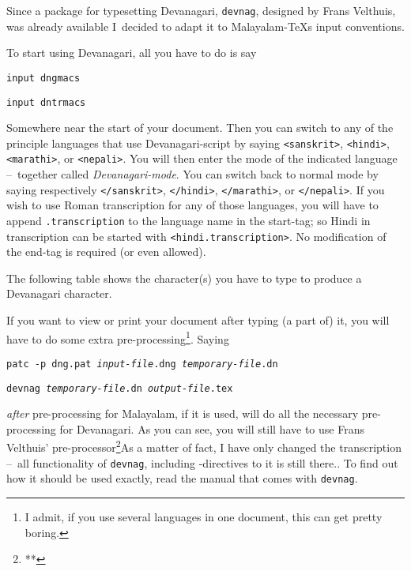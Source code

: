 





Since a package for typesetting Devanagari,
{\tt devnag}, designed by Frans Velthuis, was already available
I~decided to adapt it to Malayalam-\TeX s input conventions.

To start using Devanagari, all you have to do is say

\medskip
{\tt \bslash input dngmacs}

{\tt \bslash input dntrmacs}
\medskip

Somewhere near the start of your document. Then you can switch to
any of the principle languages that use Devanagari-script by saying
{\tt<{}sanskrit>}, {\tt<{}hindi>}, {\tt<{}marathi>}, or {\tt<{}nepali>}.
You will then enter the mode of the indicated language --~together
called {\it Devanagari-mode}.
You can switch back to normal mode by saying respectively
{\tt<{}/sanskrit>}, {\tt<{}/hindi>}, {\tt<{}/marathi>}, or {\tt<{}/nepali>}.
If you wish to use Roman transcription for any of those
languages, you will have to append {\tt .transcription} to the language
name in the start-tag; so Hindi in transcription can be started
with {\tt<{}hindi.transcription>}. No modification of the end-tag is
required (or even allowed).

The following table shows the character(s) you have to type to produce
a Devanagari character.

\bigskip

\bigskip

If you want to view or print your document after typing (a part of) it,
you will have to do some extra pre-processing\footnote*{I admit, if you
use several languages in one document, this can get pretty boring.}.
Saying

\medskip
{\tt patc -p dng.pat {\it input-file}.dng {\it temporary-file}.dn }

{\tt devnag {\it temporary-file}.dn {\it output-file}.tex}
\medskip

{\it after} pre-processing for Malayalam, if it is used,
will do all the necessary pre-processing for Devanagari. As you
can see, you will still have to use Frans Velthuis'
pre-processor\footnote{**}{As a matter of fact, I have only changed
the transcription --~all functionality of {\tt devnag}, including
{\tt@}-directives to it is still there.}.
To find out how it should be used exactly, read the manual that
comes with {\tt devnag}.

\endinput
